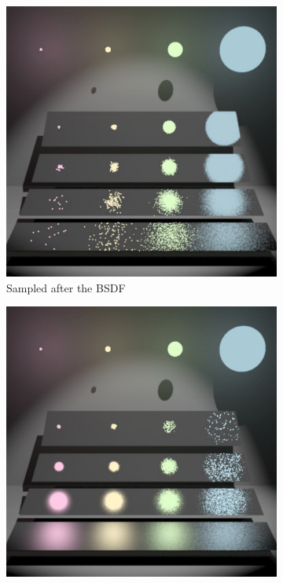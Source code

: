 \begin{figure}
    \centering
    \begin{subfigure}[b]{0.4\textwidth}
        \centering
        \includegraphics[width=\textwidth]{images/veach_mis_bsdf.png}
        \caption{Sampled after the BSDF}
        \label{fig:veach_mis_bsdf}
    \end{subfigure}
    \hfill
    \begin{subfigure}[b]{0.4\textwidth}
        \centering
        \includegraphics[width=\textwidth]{images/veach_mis_light.png}

\end{subfigure}
\end{figure}
